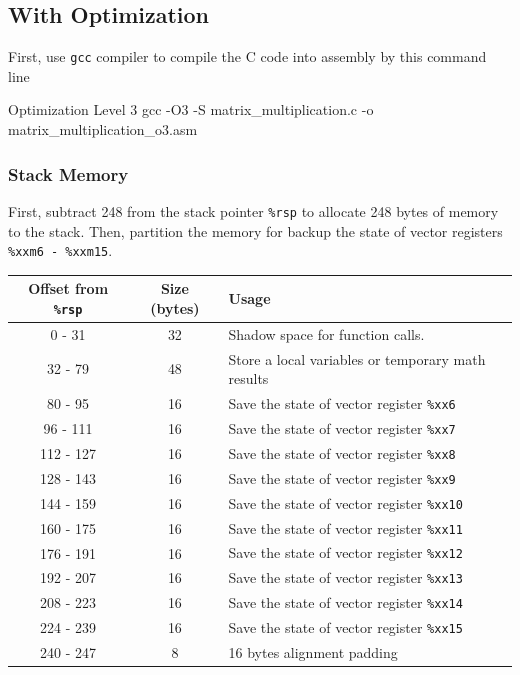 \documentclass[12pt, a4paper]{article}
\begin{document}
    \pagebreak

        \subsection{With Optimization}
            First, use \texttt{gcc} compiler to compile the C code into assembly by this command line
            \begin{codeblock}[minted language=bat]{Optimization Level 3}
                gcc -O3 -S matrix_multiplication.c -o matrix_multiplication_o3.asm
            \end{codeblock}

            \subsubsection{Stack Memory}
                First, subtract 248 from the stack pointer \texttt{\%rsp} to allocate 248 bytes of memory to the stack.
                Then, partition the memory for backup the state of vector registers \texttt{\%xxm6 - \%xxm15}.
                \begin{table}[h]
                    \centering
                    \begin{tabular}{|c|c|l|}
                        \hline
                        Offset from \texttt{\%rsp} & Size (bytes) & Usage \\
                        \hline \hline
                        0 - 31 & 32 & Shadow space for function calls. \\
                        32 - 79 & 48 & Store a local variables or temporary math results \\
                        80 - 95 & 16 & Save the state of vector register \texttt{\%xx6} \\
                        96 - 111 & 16 & Save the state of vector register \texttt{\%xx7} \\
                        112 - 127 & 16 & Save the state of vector register \texttt{\%xx8} \\
                        128 - 143 & 16 & Save the state of vector register \texttt{\%xx9} \\
                        144 - 159 & 16 & Save the state of vector register \texttt{\%xx10} \\
                        160 - 175 & 16 & Save the state of vector register \texttt{\%xx11} \\
                        176 - 191 & 16 & Save the state of vector register \texttt{\%xx12} \\
                        192 - 207 & 16 & Save the state of vector register \texttt{\%xx13} \\
                        208 - 223 & 16 & Save the state of vector register \texttt{\%xx14} \\
                        224 - 239 & 16 & Save the state of vector register \texttt{\%xx15} \\
                        240 - 247 & 8 & 16 bytes alignment padding \\
                        \hline
                    \end{tabular}
                \end{table}
\end{document}
